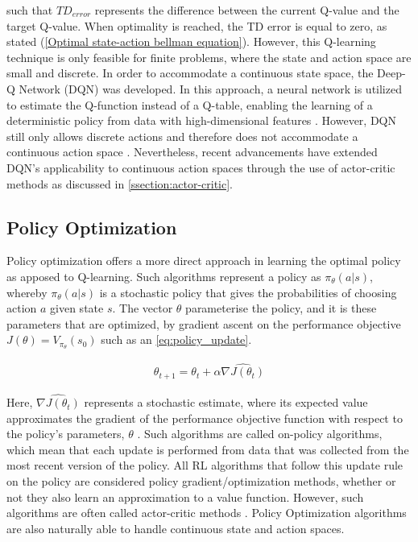 such that $TD_{error}$ represents the difference between the current Q-value and the target Q-value. When optimality is reached, the TD error is equal to zero, as stated (\autoref{Optimal state-action bellman equation}). However, this Q-learning technique is only feasible for finite problems, where the state and action space are small and discrete. In order to accommodate a continuous state space, the Deep-Q Network (DQN) was developed. In this approach, a neural network is utilized to estimate the Q-function instead of a Q-table, enabling the learning of a deterministic policy from data with high-dimensional features \cite{mnihPlayingAtariDeep2013}. However, DQN still only allows discrete actions and therefore does not accommodate a continuous action space \cite{mnihPlayingAtariDeep2013}. Nevertheless, recent advancements have extended DQN's applicability to continuous action spaces through the use of actor-critic methods as discussed in \autoref{ssection:actor-critic}.

\subsection{Policy Optimization}
Policy optimization offers a more direct approach in learning the optimal policy as apposed to Q-learning. Such algorithms represent a policy as $\pi_{\theta}(a|s)$, whereby $\pi_{\theta}(a|s)$ is a stochastic policy that gives the probabilities of choosing action $a$ given state $s$. The vector $\theta$ parameterise the policy, and it is these parameters that are optimized, by gradient ascent on the performance objective $J(\theta) = V_{\pi_{\theta}}(s_0)$ such as an \autoref{eq:policy_update}.


\begin{equation}
	\begin{aligned}
		\theta_{t+1} = \theta_{t} + \alpha \hat{\nabla J(\theta_t)}
	\end{aligned}
	\label{eq:policy_update}
\end{equation}

Here, $\hat{\nabla J(\theta_t)}$ represents a stochastic estimate, where its expected value approximates the gradient of the performance objective function with respect to the policy's parameters, $\theta$ \cite{suttonReinforcementLearningIntroduction2014}. Such algorithms are called on-policy algorithms, which mean that each update is performed from data that was collected from the most recent version of the policy.
All RL algorithms that follow this update rule on the policy are considered policy gradient/optimization methods, whether or not they also learn an approximation to a value function. However, such algorithms are often called actor-critic methods \cite{suttonReinforcementLearningIntroduction2014}.  Policy Optimization algorithms are also naturally able to handle continuous state and action spaces.


